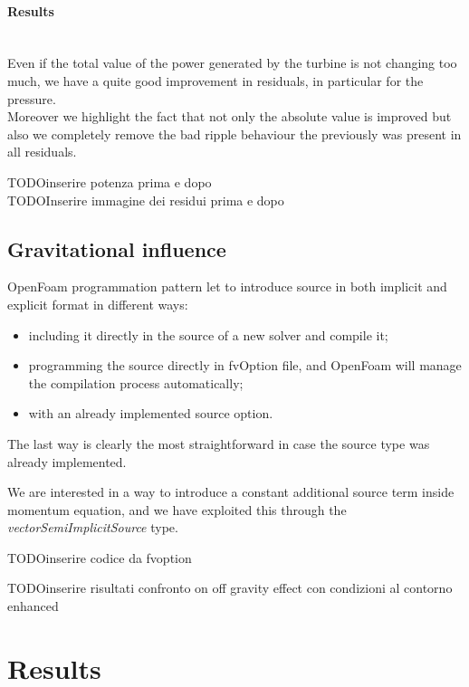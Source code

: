 \documentclass[a4paper,12pt]{article}
\newcommand{\todo}{\colorbox{cyan!60}{TODO}}
\begin{document}
\paragraph{Results}\mbox{}\\
Even if the total value of the power generated by the turbine is not changing too much, we have a quite good improvement in residuals, in particular for the pressure.
\\Moreover we highlight the fact that not only the absolute value is improved but also we completely remove the bad ripple behaviour the previously was present in all residuals.

\todo inserire potenza prima e dopo
\\
\todo Inserire immagine dei residui prima e dopo

\subsection{Gravitational influence}

OpenFoam programmation pattern let to introduce source in both implicit and explicit format in different ways:
\begin{itemize}
\item including it directly in the source of a new solver and compile it;
\item programming the source directly in fvOption file, and OpenFoam will manage the compilation process automatically;
\item with an already implemented source option.
\end{itemize}

The last way is clearly the most straightforward in case the source type was already implemented.

We are interested in a way to introduce a constant additional source term inside momentum equation, and we have exploited this through the \emph{vectorSemiImplicitSource} type.

\todo inserire codice da fvoption

\todo inserire risultati confronto on off gravity effect con condizioni al contorno enhanced









\section{Results}
\end{document}
